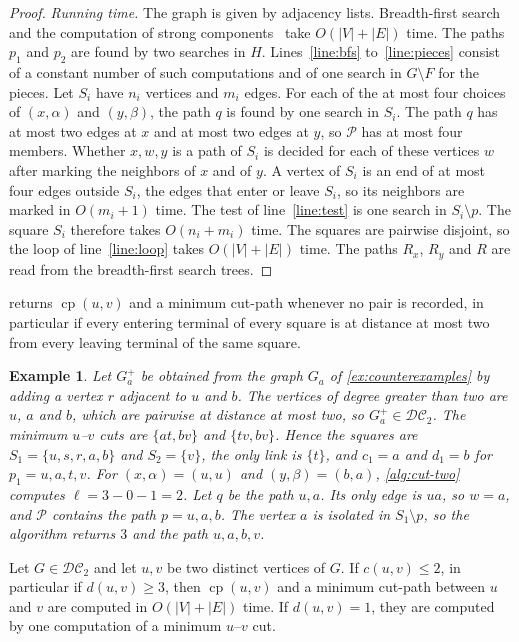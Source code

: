 \documentclass[pdflatex,sn-mathphys-num]{sn-jnl}%
\theoremstyle{thmstyleone}%
\theoremstyle{thmstyletwo}%
\newtheorem{example}{Example}%
\theoremstyle{thmstylethree}%
\newcommand{\cp}{\operatorname{cp}}%
\newcommand{\DC}{\mathcal{DC}_2}%
\begin{document}
\begin{proof}
\emph{Running time.}
The graph is given by adjacency lists.
Breadth-first search~\cite[Section~8.4]{Erickson2019Algorithms} and the computation of strong components~\cite{Tarjan1972DFS} take $O(|V| + |E|)$ time.
The paths $p_1$ and $p_2$ are found by two searches in $H$.
Lines~\ref{line:bfs} to~\ref{line:pieces} consist of a constant number of such computations and of one search in $G \setminus F$ for the pieces.
Let $S_i$ have $n_i$ vertices and $m_i$ edges.
For each of the at most four choices of $(x, \alpha)$ and $(y, \beta)$, the path $q$ is found by one search in $S_i$.
The path $q$ has at most two edges at $x$ and at most two edges at $y$, so $\mathcal{P}$ has at most four members.
Whether $x, w, y$ is a path of $S_i$ is decided for each of these vertices $w$ after marking the neighbors of $x$ and of $y$.
A vertex of $S_i$ is an end of at most four edges outside $S_i$, the edges that enter or leave $S_i$, so its neighbors are marked in $O(m_i + 1)$ time.
The test of line~\ref{line:test} is one search in $S_i \setminus p$.
The square $S_i$ therefore takes $O(n_i + m_i)$ time.
The squares are pairwise disjoint, so the loop of line~\ref{line:loop} takes $O(|V| + |E|)$ time.
The paths $R_x$, $R_y$ and $R$ are read from the breadth-first search trees.
\end{proof}

 returns $\cp(u, v)$ and a minimum cut-path whenever no pair is recorded, in particular if every entering terminal of every square is at distance at most two from every leaving terminal of the same square.

\begin{example}
\label{ex:two-edges}
Let $G_a^{+}$ be obtained from the graph $G_a$ of \cref{ex:counterexamples} by adding a vertex $r$ adjacent to $u$ and $b$.
The vertices of degree greater than two are $u$, $a$ and $b$, which are pairwise at distance at most two, so $G_a^{+} \in \DC$.
The minimum $u$--$v$ cuts are $\{at, bv\}$ and $\{tv, bv\}$.
Hence the squares are $S_1 = \{u, s, r, a, b\}$ and $S_2 = \{v\}$, the only link is $\{t\}$, and $c_1 = a$ and $d_1 = b$ for $p_1 = u, a, t, v$.
For $(x, \alpha) = (u, u)$ and $(y, \beta) = (b, a)$, \cref{alg:cut-two} computes $\ell = 3 - 0 - 1 = 2$.
Let $q$ be the path $u, a$.
Its only edge is $ua$, so $w = a$, and $\mathcal{P}$ contains the path $p = u, a, b$.
The vertex $a$ is isolated in $S_1 \setminus p$, so the algorithm returns $3$ and the path $u, a, b, v$.
\end{example}

\begin{corollary}
\label{cor:class-pairs}
Let $G \in \DC$ and let $u, v$ be two distinct vertices of $G$.
If $c(u, v) \leq 2$, in particular if $d(u, v) \geq 3$, then $\cp(u, v)$ and a minimum cut-path between $u$ and $v$ are computed in $O(|V| + |E|)$ time.
If $d(u, v) = 1$, they are computed by one computation of a minimum $u$--$v$ cut.
\end{corollary}
\end{document}
